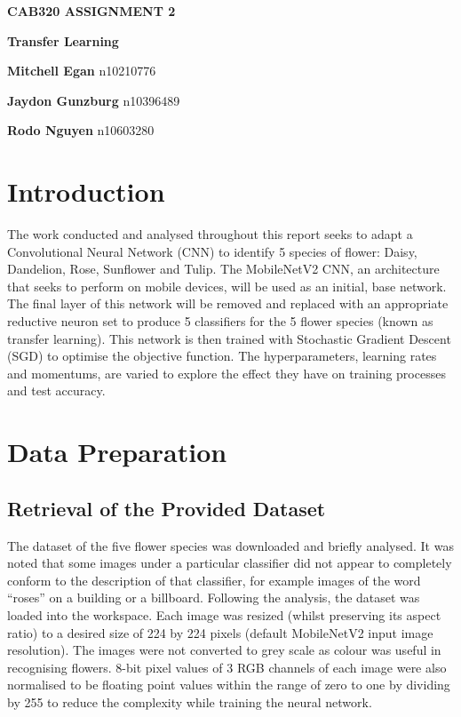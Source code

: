 \documentclass[]{article}
\begin{document}
\begin{titlepage}
    \begin{center}
        \vspace*{5cm}
            
        \Huge
        \textbf{CAB320 ASSIGNMENT 2}
            
        \vspace{0.5cm}
        \Huge
        \textbf{Transfer Learning}
            
        \vspace{1.5cm}
        
        \LARGE
        \textbf{Mitchell Egan}  n10210776
        
        \textbf{Jaydon Gunzburg}  n10396489  
        
        \textbf{Rodo Nguyen}  n10603280
        
    \end{center}
\end{titlepage}

\newpage

\section{Introduction}
The work conducted and analysed throughout this report seeks to adapt a Convolutional Neural Network (CNN) to identify 5 species of flower: Daisy, Dandelion, Rose, Sunflower and Tulip. The MobileNetV2 CNN, an architecture that seeks to perform on mobile devices, will be used as an initial, base network. The final layer of this network will be removed and replaced with an appropriate reductive neuron set to produce 5 classifiers for the 5 flower species (known as transfer learning). This network is then trained with Stochastic Gradient Descent (SGD) to optimise the objective function. The hyperparameters, learning rates and momentums, are varied to explore the effect they have on training processes and test accuracy.

\section{Data Preparation}
\subsection{Retrieval of the Provided Dataset}
The dataset of the five flower species was downloaded and briefly analysed. It was noted that some images under a particular classifier did not appear to completely conform to the description of that classifier, for example images of the word “roses” on a building or a billboard. Following the analysis, the dataset was loaded into the workspace. Each image was resized (whilst preserving its aspect ratio) to a desired size of 224 by 224 pixels (default MobileNetV2 input image resolution). The images were not converted to grey scale as colour was useful in recognising flowers. 8-bit pixel values of 3 RGB channels of each image were also normalised to be floating point values within the range of zero to one by dividing by 255 to reduce the complexity while training the neural network.
\end{document}
